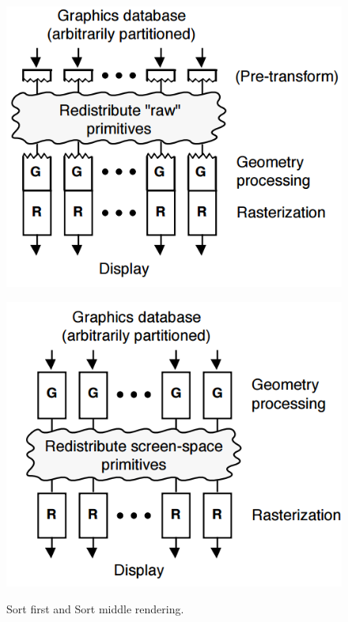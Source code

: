 \begin{figure}[!htbp]
	\centering
	\begin{minipage}{0.4\textwidth}
		\includegraphics[scale=0.28]{images/sortfirst}      
		\label{fig:sf}
	\end{minipage}
	\hfill
	\begin{minipage}{0.4\textwidth}
		\includegraphics[scale=0.28]{images/sortmiddle}
		\label{fig:sm}
	\end{minipage}
	\caption{Sort first and Sort middle rendering.}\label{fig:sfsm}
\end{figure}


